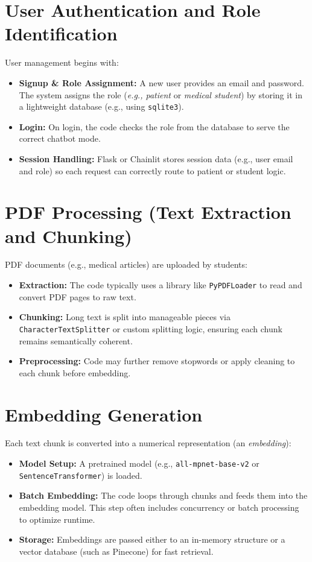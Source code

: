 \section{User Authentication and Role Identification}
\label{sec:auth-role}
User management begins with:
\begin{itemize}
    \item \textbf{Signup \& Role Assignment:} A new user provides an email and password. The system assigns the role (\textit{e.g., patient} or \textit{medical student}) by storing it in a lightweight database (e.g., using \texttt{sqlite3}).
    \item \textbf{Login:} On login, the code checks the role from the database to serve the correct chatbot mode.
    \item \textbf{Session Handling:} Flask or Chainlit stores session data (e.g., user email and role) so each request can correctly route to patient or student logic.
\end{itemize}

\section{PDF Processing (Text Extraction and Chunking)}
\label{sec:pdf-chunking}
PDF documents (e.g., medical articles) are uploaded by students:
\begin{itemize}
    \item \textbf{Extraction:} The code typically uses a library like \texttt{PyPDFLoader} to read and convert PDF pages to raw text.
    \item \textbf{Chunking:} Long text is split into manageable pieces via \texttt{CharacterTextSplitter} or custom splitting logic, ensuring each chunk remains semantically coherent. 
    \item \textbf{Preprocessing:} Code may further remove stopwords or apply cleaning to each chunk before embedding.
\end{itemize}

\section{Embedding Generation}
\label{sec:embedding}
Each text chunk is converted into a numerical representation (an \textit{embedding}):
\begin{itemize}
    \item \textbf{Model Setup:} A pretrained model (e.g., \texttt{all-mpnet-base-v2} or \texttt{SentenceTransformer}) is loaded.
    \item \textbf{Batch Embedding:} The code loops through chunks and feeds them into the embedding model. This step often includes concurrency or batch processing to optimize runtime.
    \item \textbf{Storage:} Embeddings are passed either to an in-memory structure or a vector database (such as Pinecone) for fast retrieval.
\end{itemize}

